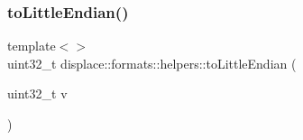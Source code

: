 \subsubsection{\texorpdfstring{toLittleEndian()}{toLittleEndian()}\hspace{0.1cm}{\footnotesize\ttfamily [2/2]}}
{\footnotesize\ttfamily template$<$$>$ \\
uint32\+\_\+t displace\+::formats\+::helpers\+::to\+Little\+Endian (\begin{DoxyParamCaption}\item[{uint32\+\_\+t}]{v }\end{DoxyParamCaption})\hspace{0.3cm}{\ttfamily [inline]}}

